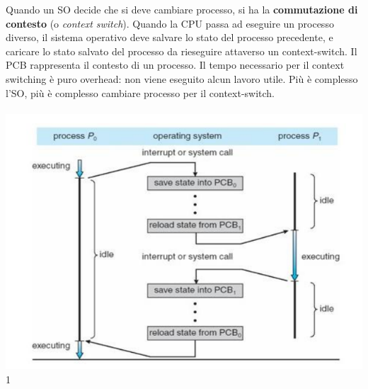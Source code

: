 \documentclass[11pt]{article}
\begin{document}
Quando un SO decide che si deve cambiare processo, si ha la \textbf{commutazione di contesto} (o \textit{context switch}). Quando la CPU passa ad eseguire un processo diverso, il sistema operativo deve salvare lo stato del processo precedente, e caricare lo stato salvato del processo da rieseguire attaverso un context-switch.
Il PCB rappresenta il contesto di un processo. Il tempo necessario per il context switching è puro overhead: non viene eseguito alcun lavoro utile. Più è complesso l'SO, più è complesso cambiare processo per il context-switch.
\\ \\
\includegraphics[scale=0.7]{context-switching.png}1
\\ \\ 
\end{document}
